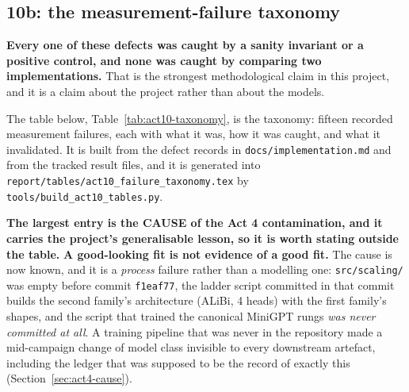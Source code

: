\documentclass[11pt,a4paper]{article}
\begin{document}
\subsection{10b: the measurement-failure taxonomy}
\label{sec:act10b}

\textbf{Every one of these defects was caught by a sanity invariant or a
positive control, and none was caught by comparing two implementations.} That
is the strongest methodological claim in this project, and it is a claim about
the project rather than about the models. %

The table below, Table~\ref{tab:act10-taxonomy}, is the taxonomy: fifteen
recorded measurement failures, each with what it was, how it was caught, and
what it invalidated. It is built from the defect records in
\texttt{docs/implementation.md} and from the tracked result files, and it is
generated into \texttt{report/tables/act10\_failure\_taxonomy.tex} by
\texttt{tools/build\_act10\_tables.py}.


\label{tab:act10-taxonomy}

\textbf{The largest entry is the CAUSE of the Act 4 contamination, and it
carries the project's generalisable lesson, so it is worth stating outside the
table.} \textbf{A good-looking fit is not evidence of a good fit.} The cause is
now known, and it is a \emph{process} failure rather than a modelling one:
\texttt{src/scaling/} was empty before commit \texttt{f1eaf77}, the ladder
script committed in that commit builds the second family's architecture
(ALiBi, 4 heads) with the first family's shapes, and the script that trained
the canonical MiniGPT rungs \emph{was never committed at all}. A training
pipeline that was never in the repository made a mid-campaign change of model
class invisible to every downstream artefact, including the ledger that was
supposed to be the record of exactly this
(Section~\ref{sec:act4-cause}). %
\end{document}
